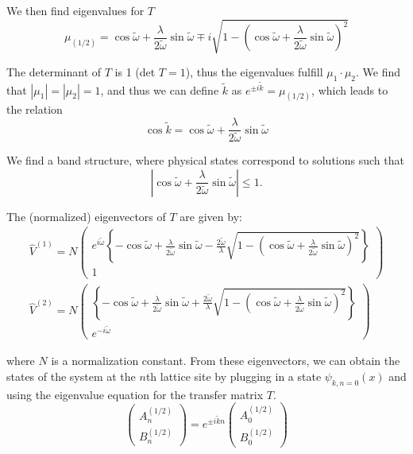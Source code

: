 We then find eigenvalues for $T$
\begin{equation}
    \mu_{(1/2)} = \cos{\tilde{\omega}} + \frac{\lambda}{2\tilde{\omega}}\sin{\tilde{\omega}}\mp i \sqrt{1-\left(\cos{\tilde{\omega} + \frac{\lambda}{2\tilde{\omega}}\sin{\tilde{\omega}}}\right)^2}
\end{equation}

The determinant of $T$ is 1 (det $T = 1$), thus the eigenvalues fulfill $\mu_1 \cdot \mu_2$. We find that $|\mu_1| = |\mu_2|=1$, and thus we can define $\tilde{k}$ as $e^{\pm i\tilde{k}} = \mu_{(1/2)}$, which leads to the relation
\begin{equation}
    \cos{\tilde{k}} = \cos{\tilde{\omega}} + \frac{\lambda}{2\tilde{\omega}}\sin{\tilde{\omega}}
\end{equation}

We find a band structure, where physical states correspond to solutions such that
\begin{equation}\label{eq:band_condition}
    \left|\cos{\tilde{\omega}} + \frac{\lambda}{2\tilde{\omega}}\sin{\tilde{\omega}}\right|\leq 1.
\end{equation}

The (normalized) eigenvectors of $T$ are given by:
\begin{gather}
    \hat{V}^{(1)}
    = N
    \begin{pmatrix}
    e^{i\tilde{\omega}}\left\lbrace-\cos{\tilde{\omega}} + \frac{\lambda}{2\tilde{\omega}}\sin{\tilde{\omega}} - \frac{2\tilde{\omega}}{\lambda}\sqrt{1-\left(\cos{\tilde{\omega}+\frac{\lambda}{2\tilde{\omega}}\sin{\tilde{\omega}}}\right)^2}
    \right\rbrace \\ 1 \end{pmatrix} \\
    \hat{V}^{(2)}
    = N
    \begin{pmatrix}
    \left\lbrace-\cos{\tilde{\omega}} + \frac{\lambda}{2\tilde{\omega}}\sin{\tilde{\omega}} + \frac{2\tilde{\omega}}{\lambda}\sqrt{1-\left(\cos{\tilde{\omega}+\frac{\lambda}{2\tilde{\omega}}\sin{\tilde{\omega}}}\right)^2}
    \right\rbrace \\ e^{-i\tilde{\omega}} \end{pmatrix}
\end{gather}

where $N$ is a normalization constant. From these eigenvectors, we can obtain the states of the system at the $n$th lattice site by plugging in a state $\psi_{k,n=0}(x)$ and using the eigenvalue equation for the transfer matrix $T$.
\begin{equation}
    \begin{pmatrix}
    A_n^{(1/2)} \\ B_n^{(1/2)}
    \end{pmatrix}
    = e^{\pm i\tilde{k}n} 
    \begin{pmatrix}
    A_0^{(1/2)} \\ B_0^{(1/2)}
    \end{pmatrix}
\end{equation}

